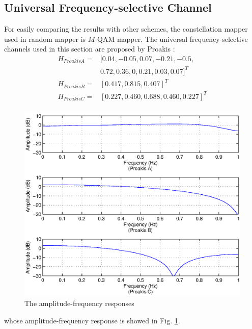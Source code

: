 \documentclass[conference]{IEEEtran}
\begin{document}
\subsection{Universal Frequency-selective Channel}
For easily comparing the results with other schemes, the constellation mapper used in random mapper is $M$-QAM mapper. The universal frequency-selective channels used in this section are proposed by Proakis \cite{proakis}:
\begin{equation}
\begin{split}
H_{Proakis A}=&[0.04, -0.05, 0.07, -0.21, -0.5,\\ &0.72, 0.36, 0, 0.21, 0.03, 0.07]^T\\
H_{Proakis B}=&[0.417, 0.815, 0.407]^T\\
H_{Proakis C}=&[0.227, 0.460, 0.688, 0.460, 0.227]^T\\
\end{split}
\end{equation}
\begin{figure}[!t]
\centering
\includegraphics[width=3 in]{PorakisBCchannelResponse.eps}
\caption{The amplitude-frequency responses}
\label{fig_channel}
\end{figure}
whose amplitude-frequency response is showed in Fig. \ref{fig_channel}.
\end{document}
